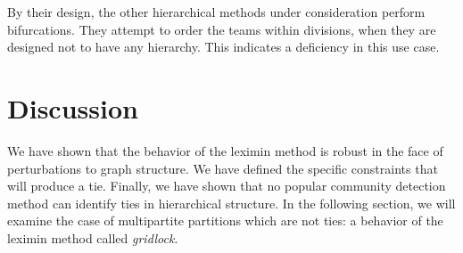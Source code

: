 By their design, the other hierarchical methods under consideration perform bifurcations. They attempt to order the teams within divisions, when they are designed not to have any hierarchy. This indicates a deficiency in this use case.


\section{Discussion}

We have shown that the behavior of the leximin method is robust in the face of perturbations to graph structure. We have defined the specific constraints that will produce a tie. Finally, we have shown that no popular community detection method can identify ties in hierarchical structure. In the following section, we will examine the case of multipartite partitions which are not ties: a behavior of the leximin method called \emph{gridlock}.


